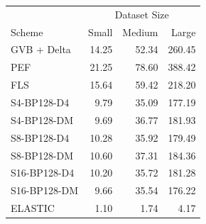 \begin{tabular}{lrrr}
\toprule
 & \multicolumn{3}{c}{Dataset Size} \\
Scheme & Small & Medium & Large \\
\midrule
GVB + Delta & 14.25 & 52.34 & 260.45 \\
PEF & 21.25 & 78.60 & 388.42 \\
FLS & 15.64 & 59.42 & 218.20 \\
S4-BP128-D4 & 9.79 & 35.09 & 177.19 \\
S4-BP128-DM & 9.69 & 36.77 & 181.93 \\
S8-BP128-D4 & 10.28 & 35.92 & 179.49 \\
S8-BP128-DM & 10.60 & 37.31 & 184.36 \\
S16-BP128-D4 & 10.20 & 35.72 & 181.28 \\
S16-BP128-DM & 9.66 & 35.54 & 176.22 \\
ELASTIC & 1.10 & 1.74 & 4.17 \\
\bottomrule
\end{tabular}
